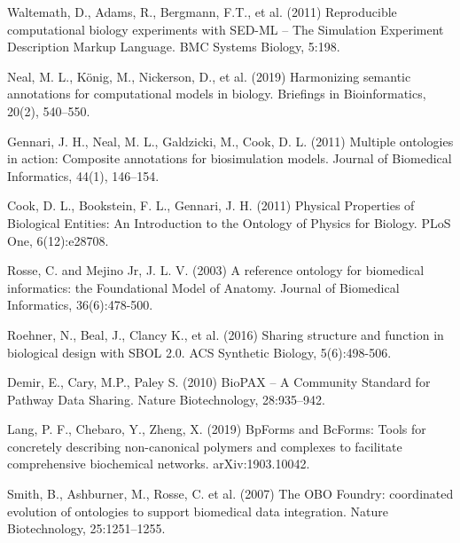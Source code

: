 \documentclass[pdftex,rgb,dvipsnames,svgnames,hyperref,table]{report}
\begin{document}
\begin{thebibliography}{9}
Waltemath, D., Adams, R., Bergmann, F.T., et al. (2011) Reproducible computational biology experiments with SED-ML -- The Simulation Experiment Description Markup Language. BMC Systems Biology, 5:198.

Neal, M. L., König, M., Nickerson, D., et al. (2019) Harmonizing semantic annotations for computational models in biology. Briefings in Bioinformatics, 20(2), 540–550.

Gennari, J. H., Neal, M. L., Galdzicki, M., Cook, D. L. (2011) Multiple ontologies in action: Composite annotations for biosimulation models. Journal of Biomedical Informatics, 44(1), 146–154.

Cook, D. L., Bookstein, F. L., Gennari, J. H. (2011) Physical Properties of Biological Entities: An Introduction to the Ontology of Physics for Biology. PLoS One, 6(12):e28708.

Rosse, C. and Mejino Jr, J. L. V. (2003) A reference ontology for biomedical informatics: the Foundational Model of Anatomy. Journal of Biomedical Informatics, 36(6):478-500.

Roehner, N., Beal, J., Clancy K., et al. (2016) Sharing structure and function in biological design with SBOL 2.0. ACS Synthetic Biology, 5(6):498-506.

Demir, E., Cary, M.P., Paley S. (2010) BioPAX – A Community Standard for Pathway Data Sharing. Nature Biotechnology, 28:935–942.

Lang, P. F., Chebaro, Y., Zheng, X. (2019) BpForms and BcForms: Tools for concretely describing non-canonical polymers and complexes to facilitate comprehensive biochemical networks. arXiv:1903.10042.

Smith, B., Ashburner, M., Rosse, C. et al. (2007) The OBO Foundry: coordinated evolution of ontologies to support biomedical data integration. Nature Biotechnology, 25:1251–1255.

\end{thebibliography}
\end{document}
